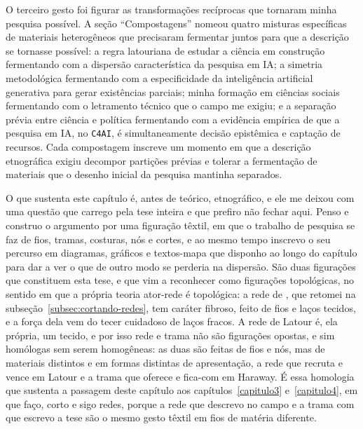 O terceiro gesto foi figurar as transformações recíprocas que tornaram minha pesquisa possível. A seção \enquote{Compostagens} nomeou quatro misturas específicas de materiais heterogêneos que precisaram fermentar juntos para que a descrição se tornasse possível: a regra latouriana de estudar a ciência em construção fermentando com a dispersão característica da pesquisa em IA; a simetria metodológica fermentando com a especificidade da inteligência artificial generativa para gerar existências parciais; minha formação em ciências sociais fermentando com o letramento técnico que o campo me exigiu; e a separação prévia entre ciência e política fermentando com a evidência empírica de que a pesquisa em IA, no \texttt{C4AI}, é simultaneamente decisão epistêmica e captação de recursos. Cada compostagem inscreve um momento em que a descrição etnográfica exigiu decompor partições prévias e tolerar a fermentação de materiais que o desenho inicial da pesquisa mantinha separados.

O que sustenta este capítulo é, antes de teórico, etnográfico, e ele me deixou com uma questão que carrego pela tese inteira e que prefiro não fechar aqui. Penso e construo o argumento por uma figuração têxtil, em que o trabalho de pesquisa se faz de fios, tramas, costuras, nós e cortes, e ao mesmo tempo inscrevo o seu percurso em diagramas, gráficos e textos-mapa que disponho ao longo do capítulo para dar a ver o que de outro modo se perderia na dispersão. São duas figurações que constituem esta tese, e que vim a reconhecer como figurações topológicas, no sentido em que a própria teoria ator-rede é topológica: a rede de \textcite{latour1996clarifications}, que retomei na subseção~\ref{subsec:cortando-redes}, tem caráter fibroso, feito de fios e laços tecidos, e a força dela vem do tecer cuidadoso de laços fracos. A rede de Latour é, ela própria, um tecido, e por isso rede e trama não são figurações opostas, e sim homólogas sem serem homogêneas: as duas são feitas de fios e nós, mas de materiais distintos e em formas distintas de apresentação, a rede que recruta e vence em Latour e a trama que oferece e fica-com em Haraway. É essa homologia que sustenta a passagem deste capítulo aos capítulos~\ref{capitulo3} e~\ref{capitulo4}, em que faço, corto e sigo redes, porque a rede que descrevo no campo e a trama com que escrevo a tese são o mesmo gesto têxtil em fios de matéria diferente.

